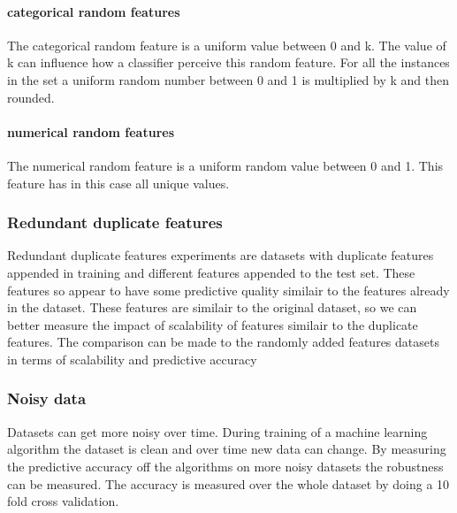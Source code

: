 \documentclass[a4paper,10pt]{article}
\begin{document}
 
\paragraph{categorical random features \newline}
The categorical random feature is a uniform value between 0 and k. The value of k can influence how a classifier perceive this random feature. For all the instances in the set a uniform random number between 0 and 1 is multiplied by k and then rounded. 
\paragraph{numerical random features \newline}
The numerical random feature is a uniform random value between 0 and 1. This feature has in this case all unique values.

\subsubsection{Redundant duplicate features}
Redundant duplicate features experiments are datasets with duplicate features appended in training and different features appended to the test set. These features so appear to have some predictive quality similair to the features already in the dataset. These features are similair to the original dataset, so we can better measure the impact of scalability of features similair to the duplicate features. The comparison can be made to the randomly added features datasets in terms of scalability and predictive accuracy 


\subsubsection{Noisy data}
Datasets can get more noisy over time. During training of a machine learning algorithm the dataset is clean and over time new data can change. By measuring the predictive accuracy off the algorithms on more noisy datasets the robustness can be measured. The accuracy is measured over the whole dataset by doing a 10 fold cross validation.
\end{document}
